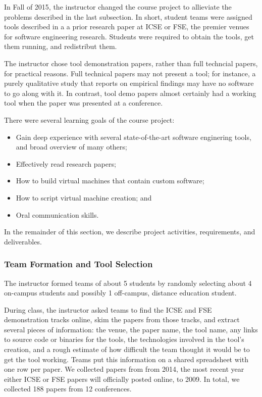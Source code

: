 \documentclass{sig-alternate-05-2015}
\begin{document}
In Fall of 2015, the instructor changed the course project
to allieviate the problems described in the last subsection.
In short, student teams were assigned tools described in a 
a prior research paper at ICSE or FSE, the premier 
venues for software engineering research.
Students were required to obtain the tools, get them running,
and redistribut them.

The instructor chose tool demonstration papers, rather than
full techncial papers, for practical reasons.
Full technical papers may not present a tool; for 
instance, a purely qualitative study that reports on 
empirical findings may have no software to go along with it.
In contrast, tool demo papers almost certainly had a working
tool when the paper was presented at a conference. 

There were several learning goals of the course project:

\begin{itemize}
  \item Gain deep experience with several state-of-the-art
  		software enginering tools, and broad overview of many others;
  \item Effectively read research papers;
  \item How to build virtual machines that contain custom
  		software;
  \item How to script virtual machine creation; and
  \item Oral communication skills. 
\end{itemize}

In the remainder of this section, we describe project
activities, requirements, and deliverables.

\subsubsection{Team Formation and Tool Selection}

The instructor formed teams of about 5 students by randomly
selecting about 4 on-campus students and possibly 1 off-campus, distance
education student.

During class, the instructor asked teams to find the ICSE
and FSE demonstration tracks online, skim the papers from those
tracks, and extract several pieces of information:
the venue, the paper name, the tool name, any links to source
code or binaries for the tools, the technologies involved in the 
tool's creation, and a rough estimate of how 
difficult the team thought it would be to get the tool working.
Teams put this information on a shared spreadsheet with one row per paper.
We collected papers from from 2014, the most recent year either ICSE or FSE
papers will officially posted online, to 2009.
In total, we collected 188 papers from 12 conferences.
\end{document}
